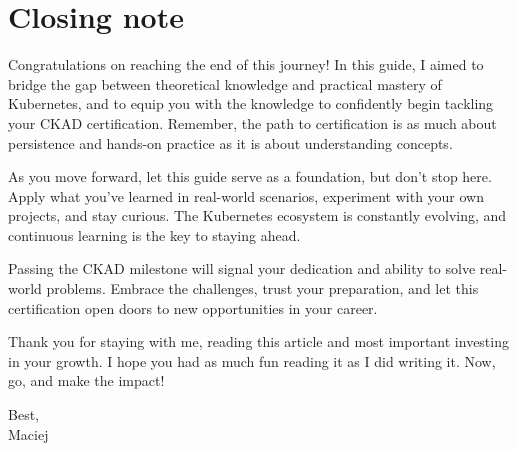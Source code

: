 \section{Closing note}

Congratulations on reaching the end of this journey! In this guide, I aimed to bridge the gap between theoretical knowledge and practical mastery of Kubernetes, and to equip you with the knowledge to confidently begin tackling your CKAD certification. Remember, the path to certification is as much about persistence and hands-on practice as it is about understanding concepts.

As you move forward, let this guide serve as a foundation, but don’t stop here. Apply what you’ve learned in real-world scenarios, experiment with your own projects, and stay curious. The Kubernetes ecosystem is constantly evolving, and continuous learning is the key to staying ahead.

Passing the CKAD milestone will signal your dedication and ability to solve real-world problems. Embrace the challenges, trust your preparation, and let this certification open doors to new opportunities in your career.

Thank you for staying with me, reading this article and most important investing in your growth. I hope you had as much fun reading it as I did writing it. Now, go, and make the impact!

\vspace{0.25cm}
\begin{multicols}{3}
\vfill\null\columnbreak
\vfill\null\columnbreak
\noindent{}Best,\\
Maciej
\end{multicols}

